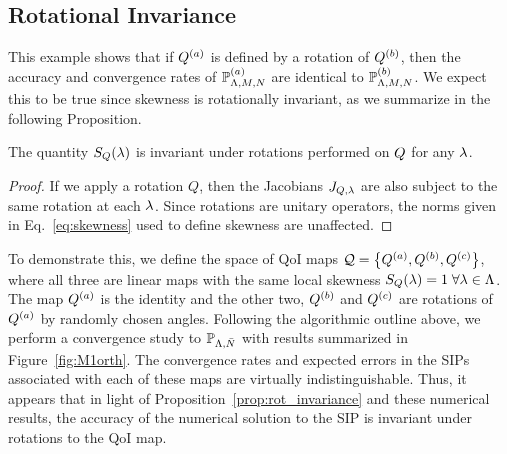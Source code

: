 \subsection{Rotational Invariance}\label{ex:rotation}
This example shows that if $Q^{(a)}$ is defined by a rotation of $Q^{(b)}$, then the accuracy and convergence rates of $\mathbb{P}^{(a)}_{{\Lambda}, M, N}$ are identical to $\mathbb{P}^{(b)}_{{\Lambda}, M, N}$. 
We expect this to be true since skewness is rotationally invariant, as we summarize in the following Proposition. 
\begin{prop}
The quantity $S_Q(\lambda)$ is invariant under rotations performed on $Q$ for any $\lambda$. \\
\label{prop:rot_invariance}
\end{prop}
\begin{proof}
If we apply a rotation $Q$, then the Jacobians $J_{Q, \lambda}$ are also subject to the same rotation at each $\lambda$. 
Since rotations are unitary operators, the norms given in Eq.~\eqref{eq:skewness} used to define skewness are unaffected.
\end{proof}

To demonstrate this, we define the space of QoI maps $\mathcal{Q} = \left\{ Q^{(a)} , Q^{(b)}, Q^{(c)} \right\}$, where all three are linear maps with the same local skewness $S_Q (\lambda) = 1 \; \forall \lambda \in {\Lambda}$. 
The map $Q^{(a)}$ is the identity and the other two, $Q^{(b)}$ and $Q^{(c)}$ are rotations of $Q^{(a)}$ by randomly chosen angles.
Following the algorithmic outline above, we perform a convergence study to $\mathbb{P}_{{\Lambda},\bar{N}}$ with results summarized in Figure~\ref{fig:M1orth}.
The convergence rates and expected errors in the SIPs associated with each of these maps are virtually indistinguishable. 
Thus, it appears that in light of Proposition~\ref{prop:rot_invariance} and these numerical results, the accuracy of the numerical solution to the SIP is invariant under rotations to the QoI map.

